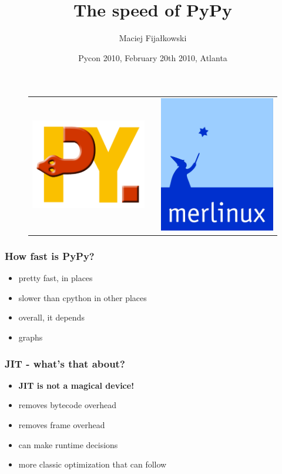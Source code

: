 \documentclass[utf8x, 14pt]{beamer}
\title{The speed of PyPy}
\author{Maciej Fijałkowski}
\institute[merlinux GmbH]
{ merlinux GmbH }
\date{Pycon 2010, February 20th 2010, Atlanta}
\begin{document}
\begin{frame}
  \titlepage
  \begin{figure}
    \begin{tabular}{c c c}
    \includegraphics[width=.30\textwidth]{../common/pypy-logo.png}
    &
    \hspace{2cm}
    &
    \includegraphics[width=.25\textwidth]{../common/merlinux-logo.png}
    \end{tabular}
  \end{figure}
\end{frame}

\begin{frame}
  \frametitle{How fast is PyPy?}
  \pause
  \begin{itemize}
    \item pretty fast, in places
    \item slower than cpython in other places
    \item overall, it depends
    \item graphs
  \end{itemize}
\end{frame}

\begin{frame}
  \frametitle{JIT - what's that about?}
  \begin{itemize}
      \pause
    \item {\bf JIT is not a magical device!}
      \pause
    \item removes bytecode overhead
    \item removes frame overhead
    \item can make runtime decisions
    \item more classic optimization that can follow
  \end{itemize}
\end{frame}
\end{document}
